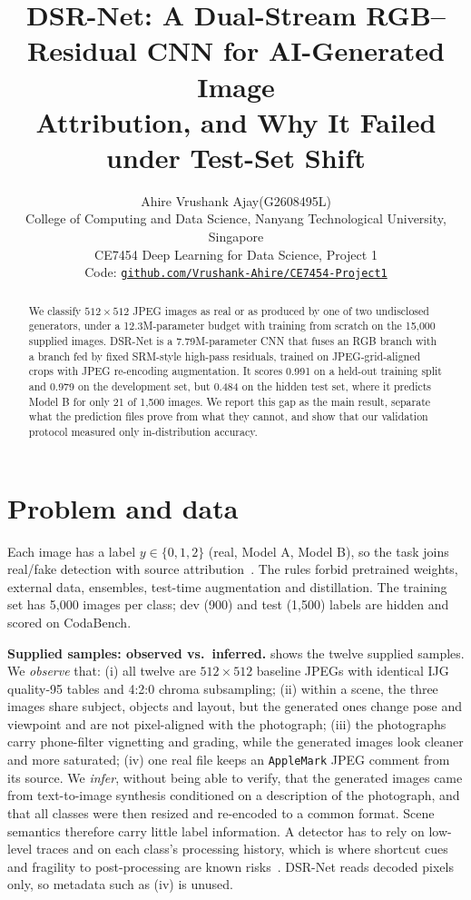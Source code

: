 \documentclass[10pt,twocolumn,letterpaper]{article}
\title{DSR-Net: A Dual-Stream RGB--Residual CNN for AI-Generated Image\\Attribution, and Why It Failed under Test-Set Shift}
\author{Ahire Vrushank Ajay\quad(G2608495L)\\
College of Computing and Data Science, Nanyang Technological University, Singapore\\
CE7454 Deep Learning for Data Science, Project 1\\
{\small Code: \href{\codeurl}{\texttt{github.com/Vrushank-Ahire/CE7454-Project1}}}
}
\renewcommand{\paragraph}[1]{\vspace{0.2em}\noindent\textbf{#1.}}
\begin{document}
\maketitle

\begin{abstract}
We classify $512{\times}512$ JPEG images as real or as produced by one of two undisclosed generators, under a 12.3M-parameter budget with training from scratch on the 15,000 supplied images. DSR-Net is a 7.79M-parameter CNN that fuses an RGB branch with a branch fed by fixed SRM-style high-pass residuals, trained on JPEG-grid-aligned crops with JPEG re-encoding augmentation. It scores 0.991 on a held-out training split and 0.979 on the development set, but 0.484 on the hidden test set, where it predicts Model B for only 21 of 1,500 images. We report this gap as the main result, separate what the prediction files prove from what they cannot, and show that our validation protocol measured only in-distribution accuracy.
\end{abstract}

\section{Problem and data}
\label{sec:intro}
Each image has a label $y\in\{0,1,2\}$ (real, Model A, Model B), so the task joins real/fake detection with source attribution~\cite{yu2019attributing}. The rules forbid pretrained weights, external data, ensembles, test-time augmentation and distillation. The training set has 5,000 images per class; dev (900) and test (1,500) labels are hidden and scored on CodaBench.

\paragraph{Supplied samples: observed vs.\ inferred}
 shows the twelve supplied samples. We \emph{observe} that: (i) all twelve are $512{\times}512$ baseline JPEGs with identical IJG quality-95 tables and 4:2:0 chroma subsampling; (ii) within a scene, the three images share subject, objects and layout, but the generated ones change pose and viewpoint and are not pixel-aligned with the photograph; (iii) the photographs carry phone-filter vignetting and grading, while the generated images look cleaner and more saturated; (iv) one real file keeps an \texttt{AppleMark} JPEG comment from its source. We \emph{infer}, without being able to verify, that the generated images came from text-to-image synthesis conditioned on a description of the photograph, and that all classes were then resized and re-encoded to a common format. Scene semantics therefore carry little label information. A detector has to rely on low-level traces and on each class's processing history, which is where shortcut cues and fragility to post-processing are known risks~\cite{grommelt2024fake,geirhos2020shortcut}. DSR-Net reads decoded pixels only, so metadata such as (iv) is unused.
\end{document}
